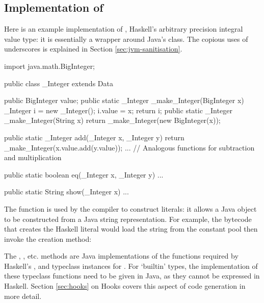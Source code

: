 \documentclass[dissertation.tex]{subfiles}
\begin{document}
\begin{appendices}
\chapter{Implementation of }\label{appendix:integer-literal}
{
    Here is an example implementation of , Haskell's arbitrary precision integral value type: it is essentially a wrapper around Java's  class. The copious uses of underscores is explained in Section \ref{sec:jvm-sanitisation}.

    \begin{javafigure}
    import java.math.BigInteger;

    public class _Integer extends Data {
        public BigInteger value;
        public static _Integer _make_Integer(BigInteger x) {
            _Integer i = new _Integer();
            i.value = x;
            return i;
        }
        public static _Integer _make_Integer(String x) {
            return _make_Integer(new BigInteger(x));
        }

        public static _Integer add(_Integer x, _Integer y) {
            return _make_Integer(x.value.add(y.value));
        }
        ... // Analogous functions for subtraction and multiplication

        public static boolean eq(_Integer x, _Integer y) { ... }

        public static String show(_Integer x) { ... }
    }
    \end{javafigure}

    The  function is used by the compiler to construct  literals: it allows a Java  object to be constructed from a Java string representation. For example, the bytecode that creates the Haskell literal  would load the string  from the constant pool then invoke the creation method:


    The , , etc. methods are Java implementations of the functions required by Haskell's ,  and  typeclass instances for . For `builtin' types, the implementation of these typeclass functions need to be given in Java, as they cannot be expressed in Haskell. Section \ref{sec:hooks} on Hooks covers this aspect of code generation in more detail.
}

\end{appendices}
\end{document}

